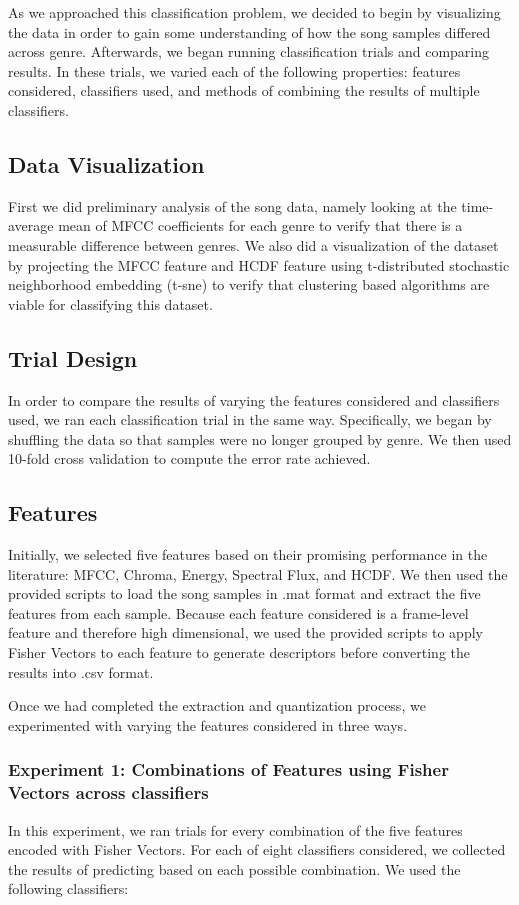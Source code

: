 As we approached this classification problem, we decided to begin by visualizing the data in order to gain some understanding of how the song samples differed across genre. Afterwards, we began running classification trials and comparing results. In these trials, we varied each of the following properties: features considered, classifiers used, and methods of combining the results of multiple classifiers.

\subsection{Data Visualization}
First we did preliminary analysis of the song data, namely looking at the time-average mean of MFCC coefficients for each genre to verify that there is a measurable difference between genres. We also did a visualization of the dataset by projecting the MFCC feature and HCDF feature using t-distributed stochastic neighborhood embedding (t-sne)  to verify that clustering based algorithms are viable for classifying this dataset.

\subsection{Trial Design}
In order to compare the results of varying the features considered and classifiers used, we ran each classification trial in the same way. Specifically, we began by shuffling the data so that samples were no longer grouped by genre. We then used 10-fold cross validation to compute the error rate achieved. 

\subsection{Features}
Initially, we selected five features based on their promising performance in the literature: MFCC, Chroma, Energy, Spectral Flux, and HCDF. We then used the provided scripts to load the song samples in .mat format and extract the five features from each sample. Because each feature considered is a frame-level feature and therefore high dimensional, we used the provided scripts to apply Fisher Vectors to each feature to generate descriptors before converting the results into .csv format. 

Once we had completed the extraction and quantization process, we experimented with varying the features considered in three ways.

\subsubsection{Experiment 1: Combinations of Features using Fisher Vectors across classifiers}
In this experiment, we ran trials for every combination of the five features encoded with Fisher Vectors. For each of eight classifiers considered, we collected the results of predicting based on each possible combination. We used the following classifiers:


